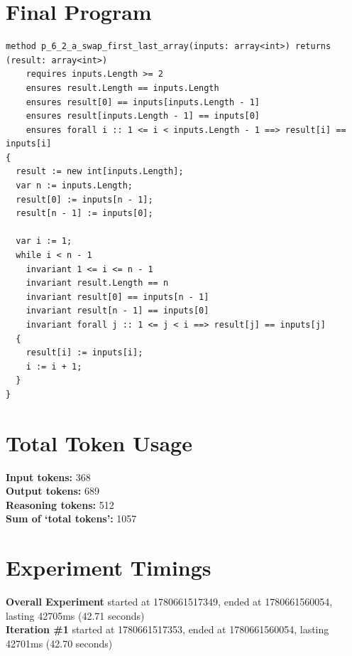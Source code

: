 \documentclass{article}
\begin{document}
\section*{Final Program}
\begin{lstlisting}
method p_6_2_a_swap_first_last_array(inputs: array<int>) returns (result: array<int>)
	requires inputs.Length >= 2
	ensures result.Length == inputs.Length
	ensures result[0] == inputs[inputs.Length - 1]
	ensures result[inputs.Length - 1] == inputs[0]
	ensures forall i :: 1 <= i < inputs.Length - 1 ==> result[i] == inputs[i]
{
  result := new int[inputs.Length];
  var n := inputs.Length;
  result[0] := inputs[n - 1];
  result[n - 1] := inputs[0];

  var i := 1;
  while i < n - 1
    invariant 1 <= i <= n - 1
    invariant result.Length == n
    invariant result[0] == inputs[n - 1]
    invariant result[n - 1] == inputs[0]
    invariant forall j :: 1 <= j < i ==> result[j] == inputs[j]
  {
    result[i] := inputs[i];
    i := i + 1;
  }
}
\end{lstlisting}
\section*{Total Token Usage}
\textbf{Input tokens: }368
\\\textbf{Output tokens: }689
\\\textbf{Reasoning tokens: }512
\\\textbf{Sum of `total tokens': }1057
\section*{Experiment Timings}
\textbf{Overall Experiment} started at 1780661517349, ended at 1780661560054, lasting 42705ms (42.71 seconds)
\\\textbf{Iteration \#1} started at 1780661517353, ended at 1780661560054, lasting 42701ms (42.70 seconds)
\end{document}
